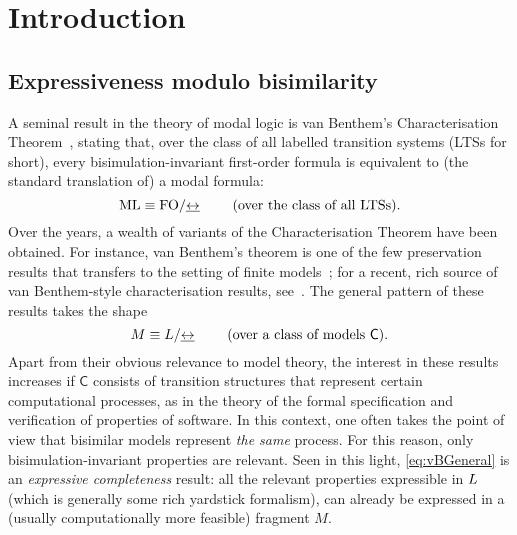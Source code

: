 
\section{Introduction}
   \label{sec:intro}

\subsection{Expressiveness modulo bisimilarity}

A seminal result in the theory of modal logic is van Benthem's Characterisation
Theorem~\cite{vanBenthemPhD}, stating that, over  the class of all labelled transition systems (LTSs for short),  every bisimulation-invariant
first-order formula is equivalent to (the standard
translation of) a modal formula:
\begin{equation}
\label{eq:vB}
\ML \equiv \fo/{\bis}  \qquad  \text{ (over the class of all LTSs)}.
\end{equation}
Over the years, a wealth of variants of the Characterisation Theorem have been
obtained.
For instance, van Benthem's theorem is one of the few
preservation results that transfers to the setting of finite
models~\cite{rose:moda97}; for a recent, rich source of van Benthem-style
characterisation results, see~\cite{DawarO09}. 
The general pattern of these results takes the shape
\begin{equation}
\label{eq:vBGeneral}
M \equiv \yvlang/{\bis}  \qquad  
\text{ (over a class of models $\mathsf{C}$)}.
\end{equation}
Apart from their obvious relevance to model theory, the interest in these 
results increases if $\mathsf{C}$ consists of transition structures that 
represent certain computational processes, as in the theory of the formal 
specification and verification of properties of software.
In this context, one often takes the point of view that bisimilar models 
represent \emph{the same} process. 
For this reason, only bisimulation-invariant properties are relevant.
Seen in this light, \eqref{eq:vBGeneral} is an \emph{expressive completeness} 
result: all the relevant properties expressible in $L$ (which is generally
some rich yardstick formalism), can already be expressed in a (usually
computationally more feasible) fragment $M$.

